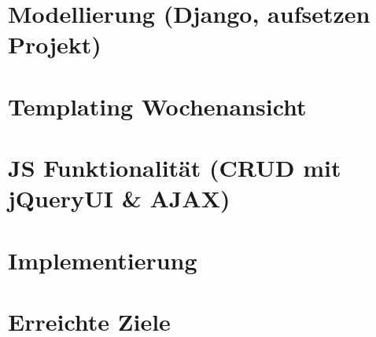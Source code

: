 
\section{Modellierung (Django, aufsetzen Projekt) }
\section{Templating Wochenansicht}
\section{JS Funktionalität (CRUD mit jQueryUI \& AJAX) }
\section{Implementierung}
\section{Erreichte Ziele}
